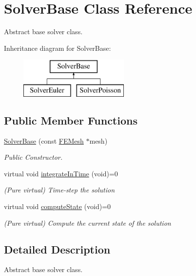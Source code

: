 \hypertarget{class_solver_base}{}\section{Solver\+Base Class Reference}
\label{class_solver_base}


Abstract base solver class.  


Inheritance diagram for Solver\+Base\+:\begin{figure}[H]
\begin{center}
\leavevmode
\includegraphics[height=2.000000cm]{class_solver_base}
\end{center}
\end{figure}
\subsection*{Public Member Functions}
\begin{DoxyCompactItemize}
\item 
\mbox{\hyperlink{class_solver_base_ac7330a480ee6025fe3abad4f3e4bd662}{Solver\+Base}} (const \mbox{\hyperlink{class_f_e_mesh}{F\+E\+Mesh}} $\ast$mesh)
\begin{DoxyCompactList}\small\item\em Public Constructor. \end{DoxyCompactList}\item 
virtual void \mbox{\hyperlink{class_solver_base_af2c51a926b461351926101b11cc6b60a}{integrate\+In\+Time}} (void)=0
\begin{DoxyCompactList}\small\item\em (Pure virtual) Time-\/step the solution \end{DoxyCompactList}\item 
virtual void \mbox{\hyperlink{class_solver_base_a818006b80f29f641b6784905e1babe0f}{compute\+State}} (void)=0
\begin{DoxyCompactList}\small\item\em (Pure virtual) Compute the current state of the solution \end{DoxyCompactList}\end{DoxyCompactItemize}


\subsection{Detailed Description}
Abstract base solver class. 


